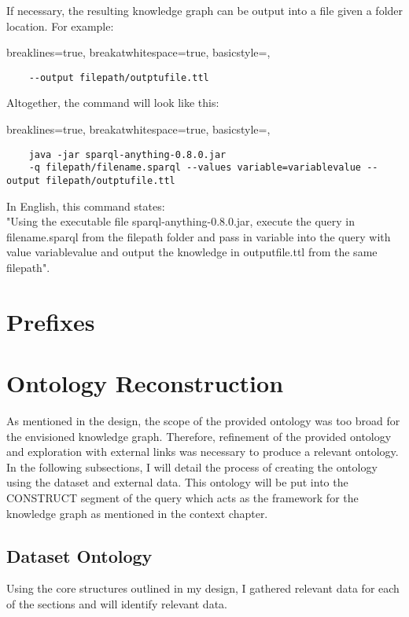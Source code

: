 \noindent If necessary, the resulting knowledge graph can be output into a file given a folder location. For example:

\lstset
{
    breaklines=true,
    breakatwhitespace=true,
    basicstyle=\ttfamily,
}
\begin{lstlisting}
    --output filepath/outptufile.ttl
\end{lstlisting}

\noindent Altogether, the command will look like this:

\lstset
{
    breaklines=true,
    breakatwhitespace=true,
    basicstyle=\ttfamily,
}
\begin{lstlisting}
    java -jar sparql-anything-0.8.0.jar
    -q filepath/filename.sparql --values variable=variablevalue --output filepath/outptufile.ttl
\end{lstlisting}

\noindent In English, this command states: \\
\hspace*{0.5cm} "Using the executable file sparql-anything-0.8.0.jar, execute the query in filename.sparql from the filepath folder and pass in variable into the query with value variablevalue and output the knowledge in outputfile.ttl from the same filepath". 

\section{Prefixes}

\section{Ontology Reconstruction}
\hspace*{0.5cm} As mentioned in the design, the scope of the provided ontology was too broad for the envisioned knowledge graph. Therefore, refinement of the provided ontology and exploration with external links was necessary to produce a relevant ontology. In the following subsections, I will detail the process of creating the ontology using the dataset and external data. This ontology will be put into the CONSTRUCT segment of the query which acts as the framework for the knowledge graph as mentioned in the context chapter. 

\subsection{Dataset Ontology}
\hspace*{0.5cm} Using the core structures outlined in my design, I gathered relevant data for each of the sections and will identify relevant data.

